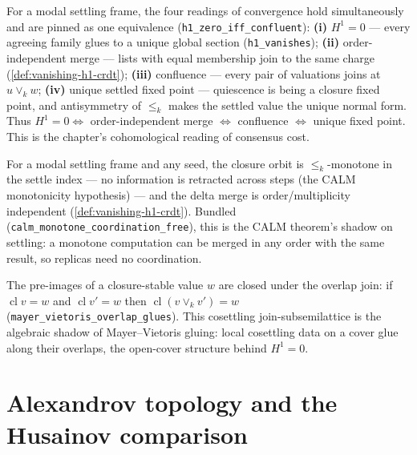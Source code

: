 \begin{theorem}\leanok{}
For a modal settling frame, the four readings of convergence hold simultaneously and are pinned as one equivalence (\texttt{h1\_zero\_iff\_confluent}): \textbf{(i)} $H^1 = 0$ --- every agreeing family glues to a unique global section (\texttt{h1\_vanishes}); \textbf{(ii)} order-independent merge --- lists with equal membership join to the same charge (\cref{def:vanishing-h1-crdt}); \textbf{(iii)} confluence --- every pair of valuations joins at $u \vee_k w$; \textbf{(iv)} unique settled fixed point --- quiescence is being a closure fixed point, and antisymmetry of $\leq_k$ makes the settled value the unique normal form. Thus $H^1 = 0 \iff$ order-independent merge $\iff$ confluence $\iff$ unique fixed point. This is the chapter's cohomological reading of consensus cost.
\end{theorem}

\begin{theorem}\leanok{}
For a modal settling frame and any seed, the closure orbit is $\leq_k$-monotone in the settle index --- no information is retracted across steps (the CALM monotonicity hypothesis) --- and the delta merge is order/multiplicity independent (\cref{def:vanishing-h1-crdt}). Bundled (\texttt{calm\_monotone\_coordination\_free}), this is the CALM theorem's shadow on settling: a monotone computation can be merged in any order with the same result, so replicas need no coordination.
\end{theorem}

\begin{theorem}\leanok{}
The pre-images of a closure-stable value $w$ are closed under the overlap join: if $\operatorname{cl} v = w$ and $\operatorname{cl} v' = w$ then $\operatorname{cl}(v \vee_k v') = w$ (\texttt{mayer\_vietoris\_overlap\_glues}). This cosettling join-subsemilattice is the algebraic shadow of Mayer--Vietoris gluing: local cosettling data on a cover glue along their overlaps, the open-cover structure behind $H^1 = 0$.
\end{theorem}

\section{Alexandrov topology and the Husainov comparison}

